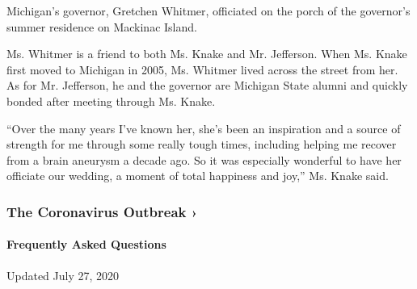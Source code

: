 Michigan's governor, Gretchen Whitmer, officiated on the porch of the
governor's summer residence on Mackinac Island.

Ms. Whitmer is a friend to both Ms. Knake and Mr. Jefferson. When Ms.
Knake first moved to Michigan in 2005, Ms. Whitmer lived across the
street from her. As for Mr. Jefferson, he and the governor are Michigan
State alumni and quickly bonded after meeting through Ms. Knake.

``Over the many years I've known her, she's been an inspiration and a
source of strength for me through some really tough times, including
helping me recover from a brain aneurysm a decade ago. So it was
especially wonderful to have her officiate our wedding, a moment of
total happiness and joy,'' Ms. Knake said.

\href{https://www.nytimes3xbfgragh.onion/news-event/coronavirus?action=click\&pgtype=Article\&state=default\&region=MAIN_CONTENT_3\&context=storylines_faq}{}

\hypertarget{the-coronavirus-outbreak-}{%
\subsubsection{The Coronavirus Outbreak
›}\label{the-coronavirus-outbreak-}}

\hypertarget{frequently-asked-questions}{%
\paragraph{Frequently Asked
Questions}\label{frequently-asked-questions}}

Updated July 27, 2020

